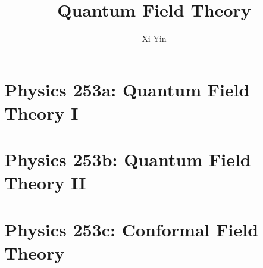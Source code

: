 \documentclass[11pt,a4paper]{article}
\title{Quantum Field Theory}
\author{Xi Yin}
\affiliation{Harvard University}
\begin{document}
\maketitle
\raggedbottom

\part{Physics 253a: Quantum Field Theory I}



\part{Physics 253b: Quantum Field Theory II}

\part{Physics 253c: Conformal Field Theory}

\end{document}

